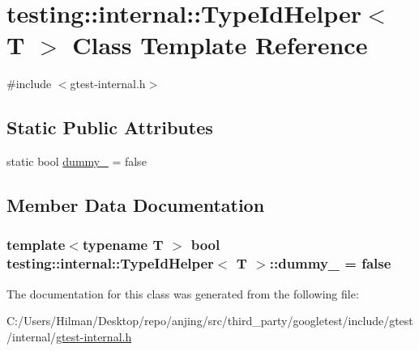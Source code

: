\hypertarget{classtesting_1_1internal_1_1_type_id_helper}{}\section{testing\+:\+:internal\+:\+:Type\+Id\+Helper$<$ T $>$ Class Template Reference}
\label{classtesting_1_1internal_1_1_type_id_helper}


{\ttfamily \#include $<$gtest-\/internal.\+h$>$}

\subsection*{Static Public Attributes}
\begin{DoxyCompactItemize}
\item 
static bool \hyperlink{classtesting_1_1internal_1_1_type_id_helper_a372268b1520d965d0bdf01ebad3d270e}{dummy\+\_\+} = false
\end{DoxyCompactItemize}


\subsection{Member Data Documentation}
\hypertarget{classtesting_1_1internal_1_1_type_id_helper_a372268b1520d965d0bdf01ebad3d270e}{}
\subsubsection[{dummy\+\_\+}]{\setlength{\rightskip}{0pt plus 5cm}template$<$typename T $>$ bool {\bf testing\+::internal\+::\+Type\+Id\+Helper}$<$ T $>$\+::dummy\+\_\+ = false\hspace{0.3cm}{\ttfamily [static]}}\label{classtesting_1_1internal_1_1_type_id_helper_a372268b1520d965d0bdf01ebad3d270e}


The documentation for this class was generated from the following file\+:\begin{DoxyCompactItemize}
\item 
C\+:/\+Users/\+Hilman/\+Desktop/repo/anjing/src/third\+\_\+party/googletest/include/gtest/internal/\hyperlink{gtest-internal_8h}{gtest-\/internal.\+h}\end{DoxyCompactItemize}
